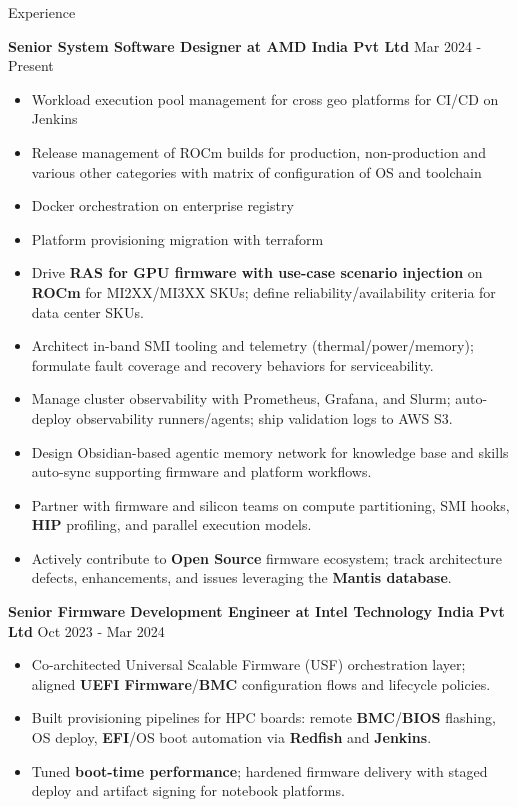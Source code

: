 \documentclass{resume} %
\begin{document}
\begin{rSection}{Experience}

{\bf Senior System Software Designer at AMD India Pvt Ltd} \hfill {Mar 2024 - Present }
\begin{itemize}
\if{}
    \item Workload execution pool management for cross geo platforms for CI/CD on Jenkins
    \item Release management of ROCm builds for production, non-production and various other categories with matrix of configuration of OS and toolchain
    \item Docker orchestration on enterprise registry
    \item Platform provisioning migration with terraform
\fi
    \item Drive \textbf{RAS for GPU firmware with use-case scenario injection} on \textbf{ROCm} for MI2XX/MI3XX SKUs; define reliability/availability criteria for data center SKUs.
    \item Architect in-band SMI tooling and telemetry (thermal/power/memory); formulate fault coverage and recovery behaviors for serviceability.
    \item Manage cluster observability with Prometheus, Grafana, and Slurm; auto-deploy observability runners/agents; ship validation logs to AWS S3.
    \item Design Obsidian-based agentic memory network for knowledge base and skills auto-sync supporting firmware and platform workflows.
    \item Partner with firmware and silicon teams on compute partitioning, SMI hooks, \textbf{HIP} profiling, and parallel execution models.
    \item Actively contribute to \textbf{Open Source} firmware ecosystem; track architecture defects, enhancements, and issues leveraging the \textbf{Mantis database}.
\end{itemize}

{\textbf{Senior Firmware Development Engineer at Intel Technology India Pvt Ltd}}  \hfill {Oct 2023 - Mar 2024}
\begin{itemize}
    \item Co-architected Universal Scalable Firmware (USF) orchestration layer; aligned \textbf{UEFI Firmware}/\textbf{BMC} configuration flows and lifecycle policies.
    \item Built provisioning pipelines for HPC boards: remote \textbf{BMC}/\textbf{BIOS} flashing, OS deploy, \textbf{EFI}/OS boot automation via \textbf{Redfish} and \textbf{Jenkins}.
    \item Tuned \textbf{boot-time performance}; hardened firmware delivery with staged deploy and artifact signing for notebook platforms.
\end{itemize}
 

\end{rSection}
\end{document}
